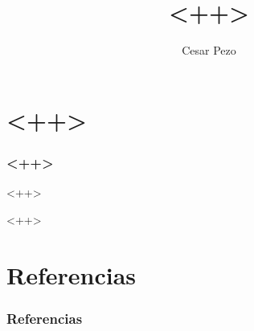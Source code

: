 \documentclass[utf8,spanish,12pt,handout]{beamer}
\title{<++>}
\author{Cesar Pezo}
\institute{Universidad Nacional de Ingeniería}
\theoremstyle{definition}
\begin{document}
\begin{frame}

\maketitle

\end{frame}

\section{<++>}

\begin{frame}
\frametitle{<++>}

<++>


\end{frame}

<++>

\section{Referencias}

\begin{frame}
\frametitle{Referencias}
\end{frame}
\end{document}
